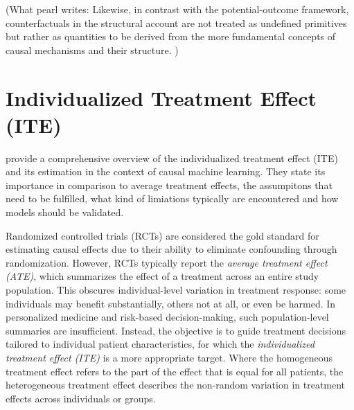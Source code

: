 (What pearl writes:  Likewise, in contrast with the potential-outcome framework, counterfactuals in the structural account are not treated as undefined primitives but rather as quantities to be derived from the more fundamental concepts of causal mechanisms and their structure. )





\section{Individualized Treatment Effect (ITE)}




\citet{curth2024} provide a comprehensive overview of the individualized treatment effect (ITE) and its estimation in the context of causal machine learning. They state its importance in comparison to average treatment effects, the assumpitons that need to be fulfilled, what kind of limiations typically are encountered and how models should be validated.



Randomized controlled trials (RCTs) are considered the gold standard for estimating causal effects due to their ability to eliminate confounding through randomization. However, RCTs typically report the \textit{average treatment effect (ATE)}, which summarizes the effect of a treatment across an entire study population. This obscures individual-level variation in treatment response: some individuals may benefit substantially, others not at all, or even be harmed. In personalized medicine and risk-based decision-making, such population-level summaries are insufficient. Instead, the objective is to guide treatment decisions tailored to individual patient characteristics, for which the \textit{individualized treatment effect (ITE)} is a more appropriate target. Where the homogeneous treatment effect refers to the part of the effect that is equal for all patients, the heterogeneous treatment effect describes the non-random variation in treatment effects across individuals or groups. 

